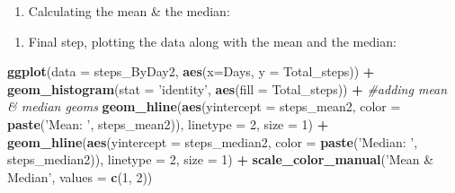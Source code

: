 \documentclass[
]{article}
\newenvironment{Shaded}{\begin{snugshade}}{\end{snugshade}}
\newcommand{\CommentTok}[1]{\textcolor[rgb]{0.56,0.35,0.01}{\textit{#1}}}
\newcommand{\DataTypeTok}[1]{\textcolor[rgb]{0.13,0.29,0.53}{#1}}
\newcommand{\DecValTok}[1]{\textcolor[rgb]{0.00,0.00,0.81}{#1}}
\newcommand{\KeywordTok}[1]{\textcolor[rgb]{0.13,0.29,0.53}{\textbf{#1}}}
\newcommand{\NormalTok}[1]{#1}
\newcommand{\OperatorTok}[1]{\textcolor[rgb]{0.81,0.36,0.00}{\textbf{#1}}}
\newcommand{\OtherTok}[1]{\textcolor[rgb]{0.56,0.35,0.01}{#1}}
\newcommand{\StringTok}[1]{\textcolor[rgb]{0.31,0.60,0.02}{#1}}
\providecommand{\tightlist}{%
  \setlength{\itemsep}{0pt}\setlength{\parskip}{0pt}}
\begin{document}
\begin{enumerate}
\def\labelenumi{\arabic{enumi}.}
\setcounter{enumi}{4}
\tightlist
\item
  Calculating the mean \& the median:
\end{enumerate}

\begin{Shaded}
\end{Shaded}

\begin{enumerate}
\def\labelenumi{\arabic{enumi}.}
\setcounter{enumi}{5}
\tightlist
\item
  Final step, plotting the data along with the mean and the median:
\end{enumerate}

\begin{Shaded}
\begin{Highlighting}[]
\KeywordTok{ggplot}\NormalTok{(}\DataTypeTok{data =}\NormalTok{ steps_ByDay2, }\KeywordTok{aes}\NormalTok{(}\DataTypeTok{x=}\NormalTok{Days, }\DataTypeTok{y =}\NormalTok{ Total_steps)) }\OperatorTok{+}
\StringTok{              }\KeywordTok{geom_histogram}\NormalTok{(}\DataTypeTok{stat =} \StringTok{'identity'}\NormalTok{, }\KeywordTok{aes}\NormalTok{(}\DataTypeTok{fill =}\NormalTok{ Total_steps)) }\OperatorTok{+}
\StringTok{  }\CommentTok{#adding mean & median geoms}
\StringTok{              }\KeywordTok{geom_hline}\NormalTok{(}\KeywordTok{aes}\NormalTok{(}\DataTypeTok{yintercept =}\NormalTok{ steps_mean2, }\DataTypeTok{color =} \KeywordTok{paste}\NormalTok{(}\StringTok{'Mean: '}\NormalTok{, steps_mean2)), }
                         \DataTypeTok{linetype =} \DecValTok{2}\NormalTok{, }\DataTypeTok{size =} \DecValTok{1}\NormalTok{) }\OperatorTok{+}
\StringTok{              }\KeywordTok{geom_hline}\NormalTok{(}\KeywordTok{aes}\NormalTok{(}\DataTypeTok{yintercept =}\NormalTok{ steps_median2, }\DataTypeTok{color =} \KeywordTok{paste}\NormalTok{(}\StringTok{'Median: '}\NormalTok{, steps_median2)), }
                         \DataTypeTok{linetype =} \DecValTok{2}\NormalTok{, }\DataTypeTok{size =} \DecValTok{1}\NormalTok{) }\OperatorTok{+}
\StringTok{              }\KeywordTok{scale_color_manual}\NormalTok{(}\StringTok{'Mean & Median'}\NormalTok{, }\DataTypeTok{values =} \KeywordTok{c}\NormalTok{(}\DecValTok{1}\NormalTok{, }\DecValTok{2}\NormalTok{))}
\end{Highlighting}
\end{Shaded}
\end{document}
